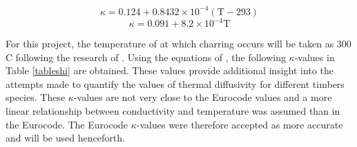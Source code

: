  \begin{equation}\label{softconeq}
 \kappa = 0.124 +0.8432 \times 10^{-4}  (\text{T}-293) 
 \end{equation}
 \begin{equation}\label{charconeq}
 \kappa = 0.091 + 8.2 \times 10^{-4} \text{T}
 \end{equation}
 
 For this project, the temperature of at which charring occurs will be taken as 300 \textdegree C following the research of \citeauthor{Westhuyzen:2020}. 
 Using the equations of \citeauthor{Shi:2021}, the following $\kappa$-values in Table \ref{tableshi} are obtained. 
 These values provide additional insight into the attempts made to quantify the values of thermal diffusivity for different timbers species.
These $\kappa$-values are not very close to the Eurocode values and a more linear relationship between conductivity and temperature  was assumed than in the Eurocode.
  The Eurocode $\kappa$-values were therefore accepted as more accurate and will be used henceforth.

